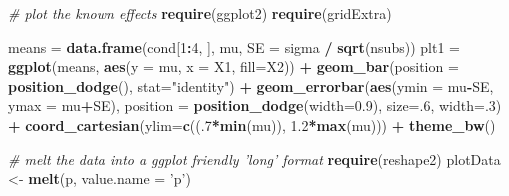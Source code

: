 \documentclass[]{book}
\newenvironment{Shaded}{\begin{snugshade}}{\end{snugshade}}
\newcommand{\CommentTok}[1]{\textcolor[rgb]{0.56,0.35,0.01}{\textit{#1}}}
\newcommand{\DataTypeTok}[1]{\textcolor[rgb]{0.13,0.29,0.53}{#1}}
\newcommand{\DecValTok}[1]{\textcolor[rgb]{0.00,0.00,0.81}{#1}}
\newcommand{\FloatTok}[1]{\textcolor[rgb]{0.00,0.00,0.81}{#1}}
\newcommand{\KeywordTok}[1]{\textcolor[rgb]{0.13,0.29,0.53}{\textbf{#1}}}
\newcommand{\NormalTok}[1]{#1}
\newcommand{\OperatorTok}[1]{\textcolor[rgb]{0.81,0.36,0.00}{\textbf{#1}}}
\newcommand{\StringTok}[1]{\textcolor[rgb]{0.31,0.60,0.02}{#1}}
\begin{document}
\begin{Shaded}
\begin{Highlighting}[]
\CommentTok{# plot the known effects}
\KeywordTok{require}\NormalTok{(ggplot2)}
\KeywordTok{require}\NormalTok{(gridExtra)}
 
\NormalTok{means =}\StringTok{ }\KeywordTok{data.frame}\NormalTok{(cond[}\DecValTok{1}\OperatorTok{:}\DecValTok{4}\NormalTok{, ], mu, }\DataTypeTok{SE =}\NormalTok{ sigma }\OperatorTok{/}\StringTok{ }\KeywordTok{sqrt}\NormalTok{(nsubs))}
\NormalTok{plt1 =}\StringTok{ }\KeywordTok{ggplot}\NormalTok{(means, }\KeywordTok{aes}\NormalTok{(}\DataTypeTok{y =}\NormalTok{ mu, }\DataTypeTok{x =}\NormalTok{ X1, }\DataTypeTok{fill=}\NormalTok{X2)) }\OperatorTok{+}
\StringTok{  }\KeywordTok{geom_bar}\NormalTok{(}\DataTypeTok{position =} \KeywordTok{position_dodge}\NormalTok{(), }\DataTypeTok{stat=}\StringTok{"identity"}\NormalTok{) }\OperatorTok{+}
\StringTok{  }\KeywordTok{geom_errorbar}\NormalTok{(}\KeywordTok{aes}\NormalTok{(}\DataTypeTok{ymin =}\NormalTok{ mu}\OperatorTok{-}\NormalTok{SE, }\DataTypeTok{ymax =}\NormalTok{ mu}\OperatorTok{+}\NormalTok{SE), }
    \DataTypeTok{position =} \KeywordTok{position_dodge}\NormalTok{(}\DataTypeTok{width=}\FloatTok{0.9}\NormalTok{), }\DataTypeTok{size=}\NormalTok{.}\DecValTok{6}\NormalTok{, }\DataTypeTok{width=}\NormalTok{.}\DecValTok{3}\NormalTok{) }\OperatorTok{+}
\StringTok{  }\KeywordTok{coord_cartesian}\NormalTok{(}\DataTypeTok{ylim=}\KeywordTok{c}\NormalTok{((.}\DecValTok{7}\OperatorTok{*}\KeywordTok{min}\NormalTok{(mu)), }\FloatTok{1.2}\OperatorTok{*}\KeywordTok{max}\NormalTok{(mu))) }\OperatorTok{+}
\StringTok{  }\KeywordTok{theme_bw}\NormalTok{()}
 
\CommentTok{# melt the data into a ggplot friendly 'long' format}
\KeywordTok{require}\NormalTok{(reshape2)}
\NormalTok{plotData <-}\StringTok{ }\KeywordTok{melt}\NormalTok{(p, }\DataTypeTok{value.name =} \StringTok{'p'}\NormalTok{)}
 

\end{Highlighting}
\end{Shaded}
\end{document}
